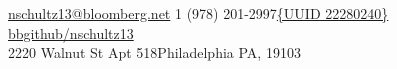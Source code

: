 \documentclass[10pt,a4paper]{article} %
\begin{document}
 



\noindent\href{mailto:nschultz13@bloomberg.net}{nschultz13@bloomberg.net}\bull %
\textsmaller{+}1 (978) 201-2997\bull \href{bbg://screens/UUID\%2022280240}{\{UUID 22280240\}} \bull %
\href{https://bbgithub.dev.bloomberg.com/nschultz13}{bbgithub/nschultz13}\\ %
2220 Walnut St Apt 518\bull Philadelphia PA, 19103 %

\spacedhrule{0.9em}{-0.4em} %





\end{document}
